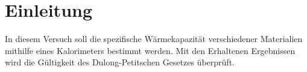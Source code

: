 
\section{Einleitung}
In diesem Versuch soll die spezifische Wärmekapazität verschiedener 
Materialien mithilfe eines Kalorimeters bestimmt werden.
Mit den Erhaltenen Ergebnissen wird die Gültigkeit des 
Dulong-Petitschen Gesetzes überprüft.